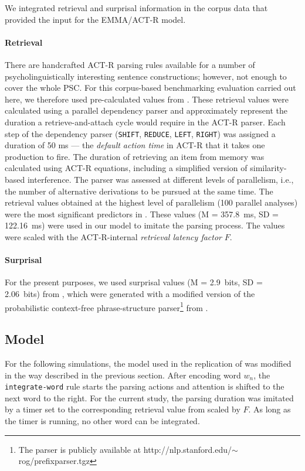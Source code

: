 We integrated retrieval and surprisal information in the corpus data that provided the input for the EMMA/ACT-R model.

\paragraph{Retrieval}
There are handcrafted ACT-R parsing rules available for a number of psycholinguistically interesting sentence constructions;  however, not enough to cover the whole PSC.  For this corpus-based benchmarking evaluation carried out here, we therefore used pre-calculated values from \cite{BostonHaleVasishth2011}.  These retrieval values were calculated using a parallel dependency parser and approximately represent the duration a retrieve-and-attach cycle would require in the ACT-R parser.  Each step of the dependency parser (\texttt{SHIFT}, \texttt{REDUCE}, \texttt{LEFT}, \texttt{RIGHT}) was assigned a duration of 50 ms --- the \emph{default action time} in ACT-R that it takes one production to fire.  The duration of retrieving an item from memory was calculated using ACT-R equations, including a simplified version of similarity-based interference.  The parser was assessed at different levels of parallelism, i.e., the number of alternative derivations to be pursued at the same time.
The retrieval values obtained at the highest level of parallelism (100 parallel analyses) were the most significant predictors in \citep{BostonHaleVasishth2011}.  These values (M = 357.8~ms, SD = 122.16~ms) were used in our model to imitate the parsing process.  The values were scaled with the ACT-R-internal  \emph{retrieval latency factor} $F$.

\paragraph{Surprisal}
For the present purposes, we used surprisal values (M = 2.9~bits, SD = 2.06~bits) from \citep{Boston2008}, which were generated with a modified version of the probabilistic context-free phrase-structure parser\footnote{The parser is publicly available at http://nlp.stanford.edu/$\sim$rog/prefixparser.tgz} from \cite{Levy2008}.

\subsection{Model}
For the following simulations, the model used in the replication of \cite{Salvucci2001} was modified in the way described in the previous section.  
After encoding word $w_n$, the \texttt{integrate-word} rule starts the parsing actions and attention is shifted to the next word to the right.  For the current study, the parsing duration was imitated by a timer set to the corresponding retrieval value from \citep{Boston2008} scaled by $F$.  As long as the timer is running, no other word can be integrated.

